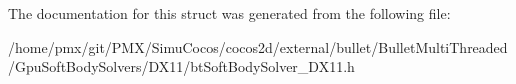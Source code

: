 The documentation for this struct was generated from the following file\+:\begin{DoxyCompactItemize}
\item 
/home/pmx/git/\+P\+M\+X/\+Simu\+Cocos/cocos2d/external/bullet/\+Bullet\+Multi\+Threaded/\+Gpu\+Soft\+Body\+Solvers/\+D\+X11/bt\+Soft\+Body\+Solver\+\_\+\+D\+X11.\+h\end{DoxyCompactItemize}
